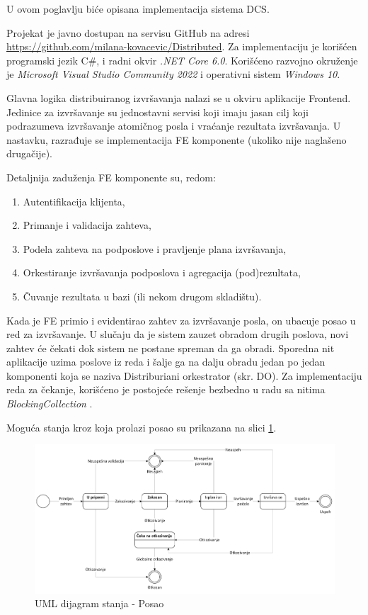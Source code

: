 \documentclass[12pt,oneside]{memoir}
\begin{document}
U ovom poglavlju biće opisana implementacija sistema DCS.

Projekat je javno dostupan na servisu GitHub na adresi \href{https://github.com/milana-kovacevic/DistributedComputationSystem}{https://github.com/milana-kovacevic/Distributed}\label{githubdsc}. Za implementaciju je korišćen programski jezik C\#, i radni okvir \emph{.NET Core 6.0}. Korišćeno razvojno okruženje je \emph{Microsoft Visual Studio Community 2022} i operativni sistem \emph{Windows 10}.

Glavna logika distribuiranog izvršavanja nalazi se u okviru aplikacije Frontend. Jedinice za izvršavanje su jednostavni servisi koji imaju jasan cilj koji podrazumeva izvršavanje atomičnog posla i vraćanje rezultata izvršavanja. U nastavku, razrađuje se implementacija FE komponente (ukoliko nije naglašeno drugačije).

Detaljnija zaduženja FE komponente su, redom:
\begin{enumerate}
\item Autentifikacija klijenta,
\item Primanje i validacija zahteva,
\item \label{podela_planiranje}Podela zahteva na podposlove i pravljenje plana izvršavanja,
\item \label{orkestriranje}Orkestiranje izvršavanja podposlova i agregacija (pod)rezultata,
\item \label{cuvanje_u_bazi}Čuvanje rezultata u bazi (ili nekom drugom skladištu).
\end{enumerate}

Kada je FE primio i evidentirao zahtev za izvršavanje posla, on ubacuje posao u red za izvršavanje. U slučaju da je sistem zauzet obradom drugih poslova, novi zahtev će čekati dok sistem ne postane spreman da ga obradi. Sporedna nit aplikacije uzima poslove iz reda i šalje ga na dalju obradu jedan po jedan komponenti koja se naziva Distriburiani orkestrator (skr. DO). Za implementaciju reda za čekanje, korišćeno je postojeće rešenje bezbedno u radu sa nitima \emph{BlockingCollection} \cite{BlockingCollection}.

Moguća stanja kroz koja prolazi posao su prikazana na slici \ref{fig:stanjaposla}.

\begin{figure}[!ht]
  \centering
  \includegraphics[width=1.0\textwidth]{./images/dijagram_stanja_posao.png}
  \caption{UML dijagram stanja - Posao}
  \label{fig:stanjaposla}
\end{figure}
\end{document}
